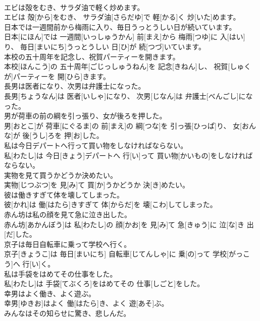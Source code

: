 \documentclass[8pt]{extreport}
\begin{document}
\begin{CJK}{UTF8}{min}
\\	エビは殻をむき、サラダ油で軽く炒めます。	
\\	エビは 殻[から]をむき、 サラダ油[さらだゆ]で 軽[かる]く 炒[いた]めます。
\\	日本では一週間前から梅雨に入り、毎日うっとうしい日が続いています。	
\\	日本[にほん]では 一週間[いっしゅうかん] 前[まえ]から 梅雨[つゆ]に 入[はい]り、 毎日[まいにち]うっとうしい 日[ひ]が 続[つづ]いています。
\\	本校の五十周年を記念し、祝賀パーティーを開きます。	
\\	本校[ほんこう]の 五十周年[ごじっしゅうねん]を 記念[きねん]し、 祝賀[しゅくが]パーティーを 開[ひら]きます。
\\	長男は医者になり、次男は弁護士になった。	
\\	長男[ちょうなん]は 医者[いしゃ]になり、 次男[じなん]は 弁護士[べんごし]になった。
\\	男が荷車の前の綱を引っ張り、女が後ろを押した。	
\\	男[おとこ]が 荷車[にぐるま]の 前[まえ]の 綱[つな]を 引っ張[ひっぱ]り、 女[おんな]が 後[うし]ろを 押[お]した。
\\	私は今日デパートへ行って買い物をしなければならない。	
\\	私[わたし]は 今日[きょう]デパートへ 行[い]って 買い物[かいもの]をしなければならない。
\\	実物を見て買うかどうか決めたい。	
\\	実物[じつぶつ]を 見[み]て 買[か]うかどうか 決[き]めたい。
\\	彼は働きすぎて体を壊してしまった。	
\\	彼[かれ]は 働[はたら]きすぎて 体[からだ]を 壊[こわ]してしまった。
\\	赤ん坊は私の顔を見て急に泣き出した。	
\\	赤ん坊[あかんぼう]は 私[わたし]の 顔[かお]を 見[み]て 急[きゅう]に 泣[な]き 出[だ]した。
\\	京子は毎日自転車に乗って学校へ行く。	
\\	京子[きょうこ]は 毎日[まいにち] 自転車[じてんしゃ]に 乗[の]って 学校[がっこう]へ 行[い]く。
\\	私は手袋をはめてその仕事をした。	
\\	私[わたし]は 手袋[てぶくろ]をはめてその 仕事[しごと]をした。
\\	幸男はよく働き、よく遊ぶ。	
\\	幸男[ゆきお]はよく 働[はたら]き、よく 遊[あそ]ぶ。
\\	みんなはその知らせに驚き、悲しんだ。	

\end{CJK}
\end{document}
